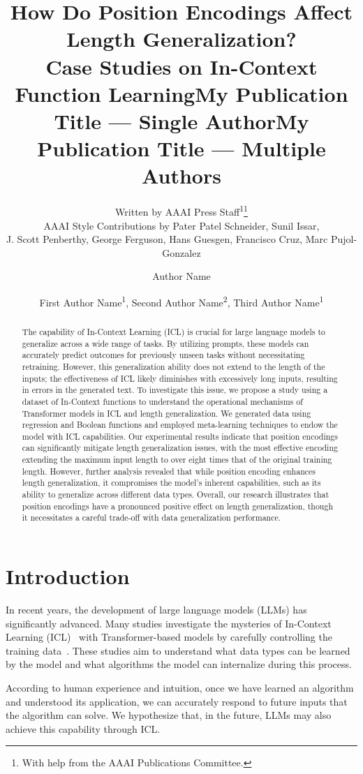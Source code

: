 \documentclass[letterpaper]{article} %
\title{How Do Position Encodings Affect Length Generalization?\\
Case Studies on In-Context Function Learning}
\author{
    Written by AAAI Press Staff\textsuperscript{\rm 1}\thanks{With help from the AAAI Publications Committee.}\\
    AAAI Style Contributions by Pater Patel Schneider,
    Sunil Issar,\\
    J. Scott Penberthy,
    George Ferguson,
    Hans Guesgen,
    Francisco Cruz\equalcontrib,
    Marc Pujol-Gonzalez\equalcontrib
}
\title{My Publication Title --- Single Author}
\author {
    Author Name
}
\title{My Publication Title --- Multiple Authors}
\author {
    First Author Name\textsuperscript{\rm 1},
    Second Author Name\textsuperscript{\rm 2},
    Third Author Name\textsuperscript{\rm 1}
}
\begin{document}
\maketitle

\begin{abstract}
    The capability of In-Context Learning (ICL) is crucial for large language models to generalize across a wide range of tasks. By utilizing prompts, these models can accurately predict outcomes for previously unseen tasks without necessitating retraining. However, this generalization ability does not extend to the length of the inputs; the effectiveness of ICL likely diminishes with excessively long inputs, resulting in errors in the generated text. To investigate this issue, we propose a study using a dataset of In-Context functions to understand the operational mechanisms of Transformer models in ICL and length generalization. We generated data using regression and Boolean functions and employed meta-learning techniques to endow the model with ICL capabilities. Our experimental results indicate that position encodings can significantly mitigate length generalization issues, with the most effective encoding extending the maximum input length to over eight times that of the original training length. However, further analysis revealed that while position encoding enhances length generalization, it compromises the model's inherent capabilities, such as its ability to generalize across different data types. Overall, our research illustrates that position encodings have a pronounced positive effect on length generalization, though it necessitates a careful trade-off with data generalization performance.
\end{abstract}

\section{Introduction}
In recent years, the development of large language models (LLMs) has significantly advanced. Many studies investigate the mysteries of In-Context Learning (ICL)~\cite{brown-2020-language} with Transformer-based models by carefully controlling the training data~\cite{garg-2022-what, akyurek-2023-what, zhou-2024-what}. These studies aim to understand what data types can be learned by the model and what algorithms the model can internalize during this process.

According to human experience and intuition, once we have learned an algorithm and understood its application, we can accurately respond to future inputs that the algorithm can solve. We hypothesize that, in the future, LLMs may also achieve this capability through ICL.
\end{document}
